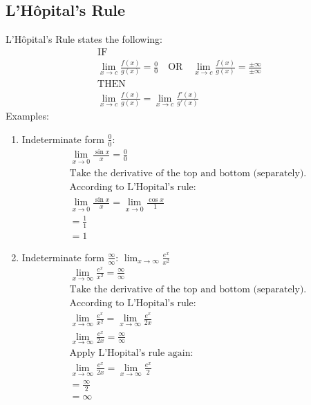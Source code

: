 \documentclass[12pt]{article}
\begin{document}
        \subsection{L'Hôpital's Rule} %
            L'Hôpital's Rule states the following:
            \begin{gather*}
                \text{IF} \\
                \lim_{x \to c} \frac{f(x)}{g(x)} = \frac{0}{0} \quad \text{OR} \quad \lim_{x \to c} \frac{f(x)}{g(x)} = \frac{\pm \infty}{\pm \infty} \\[6pt]
                \text{THEN} \\
                \lim_{x \to c} \frac{f(x)}{g(x)} = \lim_{x \to c} \frac{f'(x)}{g'(x)}
            \end{gather*}
            Examples:
            \begin{enumerate}
                \item Indeterminate form $\frac{0}{0}$:
                \begin{gather*}
                    \lim_{x \to 0} \frac{\sin{x}}{x} = \frac{0}{0} \\[6pt]
                    \text{Take the derivative of the top and bottom (separately).}\\
                    \text{According to L'Hopital's rule:} \\
                    \lim_{x \to 0} \frac{\sin{x}}{x} = \lim_{x \to 0} \frac{\cos{x}}{1} \\[6pt]
                    = \frac{1}{1} \\[6pt]
                    = 1
                \end{gather*}
                \item Indeterminate form $\frac{\infty}{\infty}$: $\lim_{x \to \infty} \frac{e^x}{x^2}$
                \begin{gather*}
                    \lim_{x \to \infty} \frac{e^x}{x^2} = \frac{\infty}{\infty} \\[6pt]
                    \text{Take the derivative of the top and bottom (separately).}\\
                    \text{According to L'Hopital's rule:} \\
                    \lim_{x \to \infty} \frac{e^x}{x^2} = \lim_{x \to \infty} \frac{e^x}{2x} \\[6pt]
                    \lim_{x \to \infty} \frac{e^x}{2x} = \frac{\infty}{\infty} \\[6pt]
                    \text{Apply L'Hopital's rule again:} \\
                    \lim_{x \to \infty} \frac{e^x}{2x} = \lim_{x \to \infty} \frac{e^x}{2} \\[6pt]
                    = \frac{\infty}{2} \\[6pt]
                    = \infty
                \end{gather*}
            \end{enumerate}
\end{document}
